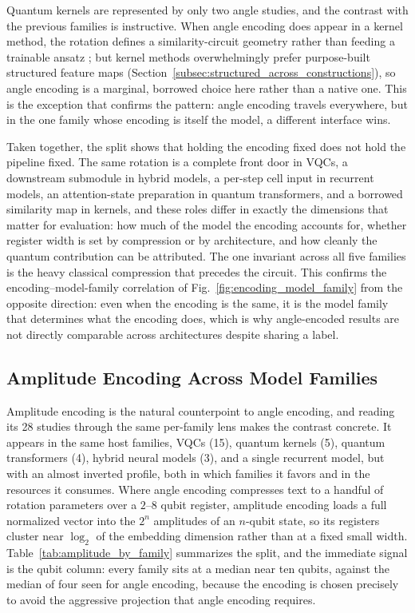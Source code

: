 \documentclass{ieeeaccess}
\begin{document}
Quantum kernels are represented by only two angle studies, and the contrast with the previous families is instructive. When angle encoding does appear in a kernel method, the rotation defines a similarity-circuit geometry rather than feeding a trainable ansatz \cite{hsu_quantum_2025,boopalamani_quantum-enhanced_2025}; but kernel methods overwhelmingly prefer purpose-built structured feature maps (Section~\ref{subsec:structured_across_constructions}), so angle encoding is a marginal, borrowed choice here rather than a native one. This is the exception that confirms the pattern: angle encoding travels everywhere, but in the one family whose encoding is itself the model, a different interface wins.

Taken together, the split shows that holding the encoding fixed does not hold the pipeline fixed. The same rotation is a complete front door in VQCs, a downstream submodule in hybrid models, a per-step cell input in recurrent models, an attention-state preparation in quantum transformers, and a borrowed similarity map in kernels, and these roles differ in exactly the dimensions that matter for evaluation: how much of the model the encoding accounts for, whether register width is set by compression or by architecture, and how cleanly the quantum contribution can be attributed. The one invariant across all five families is the heavy classical compression that precedes the circuit. This confirms the encoding--model-family correlation of Fig.~\ref{fig:encoding_model_family} from the opposite direction: even when the encoding is the same, it is the model family that determines what the encoding does, which is why angle-encoded results are not directly comparable across architectures despite sharing a label.

\subsection{Amplitude Encoding Across Model Families}
\label{subsec:amplitude_across_families}

Amplitude encoding is the natural counterpoint to angle encoding, and reading its 28 studies through the same per-family lens makes the contrast concrete. It appears in the same host families, VQCs (15), quantum kernels (5), quantum transformers (4), hybrid neural models (3), and a single recurrent model, but with an almost inverted profile, both in which families it favors and in the resources it consumes. Where angle encoding compresses text to a handful of rotation parameters over a $2$--$8$ qubit register, amplitude encoding loads a full normalized vector into the $2^{n}$ amplitudes of an $n$-qubit state, so its registers cluster near $\log_2$ of the embedding dimension rather than at a fixed small width. Table~\ref{tab:amplitude_by_family} summarizes the split, and the immediate signal is the qubit column: every family sits at a median near ten qubits, against the median of four seen for angle encoding, because the encoding is chosen precisely to avoid the aggressive projection that angle encoding requires.
\end{document}
